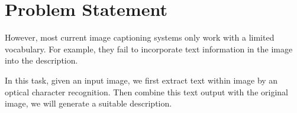 \section{Problem Statement}


However, most current image captioning systems only work with a limited vocabulary. For example, they fail to incorporate text information in the image into the description. 

In this task, given an input image, we first extract text within image by an optical character recognition. Then combine this text output with the original image, we will generate a suitable description.





